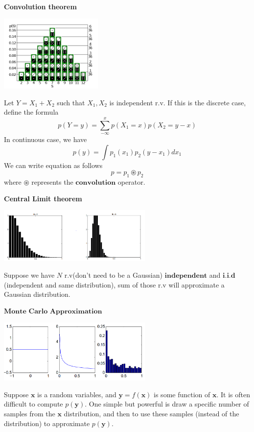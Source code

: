 \documentclass[10pt,landscape]{article}
\newcommand{\inp}{\textbf{x}}
\newcommand{\out}{\textbf{y}}
\begin{document}
\begin{multicols*}{3}
\textbf{Convolution theorem}

\begin{minipage}{\linewidth}
    \centering
    \includegraphics[width=2in]{figures/convolution.PNG}
\end{minipage}

Let $Y=X_1+X_2$ such that $X_1,X_2$ is independent r.v. If this is the discrete case, define the formula
\[
    p(Y=y)=\sum_{-\infty}^{x}p(X_1=x)p(X_2=y-x)
\]
In continuous case, we have
\[
    p(y)=\int p_1(x_1)p_2(y-x_1)dx_1
\]
We can write equation as follows
\[
    p = p_1 \circledast p_2
\]
where $\circledast$ represents the $\textbf{convolution}$ operator.

\textbf{Central Limit theorem}
\begin{minipage}{\linewidth}
    \centering
    \includegraphics[width=3in]{figures/CLT.PNG}
\end{minipage}
Suppose we have $N$ r.v(don't need to be a Gaussian) $\textbf{independent}$ and $\textbf{i.i.d}$(independent and same distribution), sum of those r.v will approximate a Gaussian distribution.

$\textbf{Monte Carlo Approximation}$
\begin{minipage}{\linewidth}
    \centering
    \includegraphics[width=3in]{figures/monte-carlo.PNG}
\end{minipage}

Suppose $\inp$ is a random variables, and $\out=f(\inp)$ is some function of $\inp$. It is often  difficult to compute $p(\out)$. One simple but powerful is draw a specific number of samples from the $\inp$ distribution, and then to use these samples (instead of the distribution) to approximate $p(\out)$.


\end{multicols*}
\end{document}
